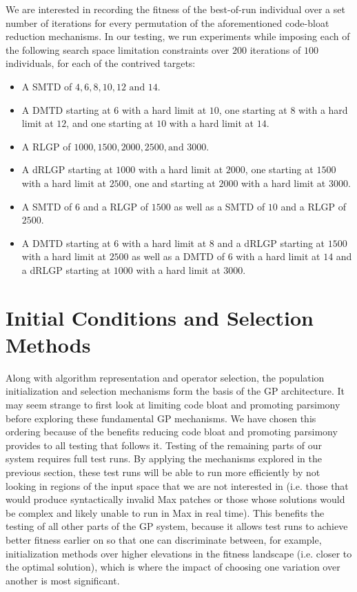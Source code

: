 \documentclass[12pt]{report} 	%
\numberwithin{figure}{chapter}
\numberwithin{table}{chapter}
\numberwithin{equation}{chapter}
\begin{document}
\begin{flushleft}
We are interested in recording the fitness of the best-of-run individual over a set number of iterations for every permutation of the aforementioned code-bloat reduction mechanisms. In our testing, we run experiments while imposing each of the following search space limitation constraints over $200$ iterations of $100$ individuals, for each of the contrived targets:
\begin{itemize}
\item A SMTD of $4,6,8, 10, 12 \text{ and }14$.
\item A DMTD starting at $6$ with a hard limit at $10$, one starting at $8$ with a hard limit at $12$, and one starting at $10$ with a hard limit at $14$.
\item A RLGP of $1000, 1500, 2000, 2500, \text{and } 3000$.
\item A dRLGP starting at $1000$ with a hard limit at $2000$, one starting at $1500$ with a hard limit at $2500$, one and starting at $2000$ with a hard limit at $3000$.
\item A SMTD of $6$ and a RLGP of $1500$ as well as a SMTD of $10$ and a RLGP of $2500$.
\item A DMTD starting at $6$ with a hard limit at $8$ and a dRLGP starting at $1500$ with a hard limit at $2500$ as well as a DMTD of $6$ with a hard limit at $14$ and a dRLGP starting at  $1000$ with a hard limit at $3000$.
\end{itemize}

\section{Initial Conditions and Selection Methods}

Along with algorithm representation and operator selection, the population initialization and selection mechanisms form the basis of the GP architecture. It may seem strange to first look at limiting code bloat and promoting parsimony before exploring these fundamental GP mechanisms. We have chosen this ordering because of the benefits reducing code bloat and promoting parsimony provides to all testing that follows it. Testing of the remaining parts of our system requires full test runs. By applying the mechanisms explored in the previous section, these test runs will be able to run more efficiently by not looking in regions of the input space that we are not interested in (i.e. those that would produce syntactically invalid Max patches or those whose solutions would be complex and likely unable to run in Max in real time). This benefits the testing of all other parts of the GP system, because it allows test runs to achieve better fitness earlier on so that one can discriminate between, for example, initialization methods over higher elevations in the fitness landscape (i.e. closer to the optimal solution), which is where the impact of choosing one variation over another is most significant.


\end{flushleft}
\end{document}
